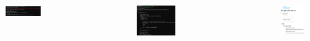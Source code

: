 \documentclass{tikzposter}
\begin{document}
\begin{columns}

    {
        \begin{tikzfigure}
            \includegraphics[width=0.3\textwidth]{webapi_console.PNG}
            
        \end{tikzfigure}

        \begin{tikzfigure}
            \includegraphics[width=0.3\textwidth]{chicagofire_console.png}

        \end{tikzfigure}

        \begin{tikzfigure}
            \includegraphics[width=0.3\textwidth]{chicagofire.png}
            
        \end{tikzfigure}
    }


\end{columns}
\end{document}
